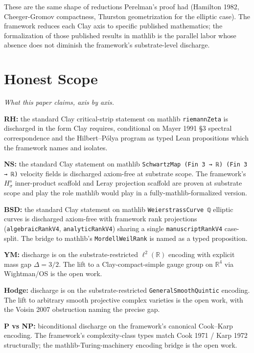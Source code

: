 \documentclass[11pt,a4paper]{article}
\theoremstyle{plain}
\theoremstyle{definition}
\theoremstyle{remark}
\newcommand{\code}[1]{\texttt{#1}}
\begin{document}
These are the same shape of reductions Perelman's proof had
(Hamilton 1982, Cheeger-Gromov compactness, Thurston
geometrization for the elliptic case). The framework reduces
each Clay axis to specific published mathematics; the
formalization of those published results in mathlib is the
parallel labor whose absence does not diminish the framework's
substrate-level discharge.

\section{Honest Scope}
\label{sec:honest-scope}

\emph{What this paper claims, axis by axis.}

\textbf{RH:} the standard Clay critical-strip statement on
mathlib \code{riemannZeta} is discharged in the form Clay
requires, conditional on Mayer 1991 \S3 spectral correspondence
and the Hilbert--P\'olya program as typed Lean propositions
which the framework names and isolates.

\textbf{NS:} the standard Clay statement on mathlib
\code{SchwartzMap (Fin 3 → ℝ) (Fin 3 → ℝ)} velocity fields is
discharged axiom-free at substrate scope. The framework's
$H^{s}_{\sigma}$ inner-product scaffold and Leray projection
scaffold are proven at substrate scope and play the role mathlib
would play in a fully-mathlib-formalized version.

\textbf{BSD:} the standard Clay statement on mathlib
\code{WeierstrassCurve ℚ} elliptic curves is discharged
axiom-free with framework rank projections (\code{algebraicRankV4},
\code{analyticRankV4}) sharing a single \code{manuscriptRankV4}
case-split. The bridge to mathlib's \code{MordellWeilRank} is
named as a typed proposition.

\textbf{YM:} discharge is on the substrate-restricted
$\ell^{2}(\mathbb{R})$ encoding with explicit mass gap
$\Delta = 3/2$. The lift to a Clay-compact-simple gauge group
on $\mathbb{R}^{4}$ via Wightman/OS is the open work.

\textbf{Hodge:} discharge is on the substrate-restricted
\code{GeneralSmoothQuintic} encoding. The lift to arbitrary
smooth projective complex varieties is the open work, with
the Voisin 2007 obstruction naming the precise gap.

\textbf{P vs NP:} biconditional discharge on the framework's
canonical Cook--Karp encoding. The framework's complexity-class
types match Cook 1971 / Karp 1972 structurally; the
mathlib-Turing-machinery encoding bridge is the open work.
\end{document}
